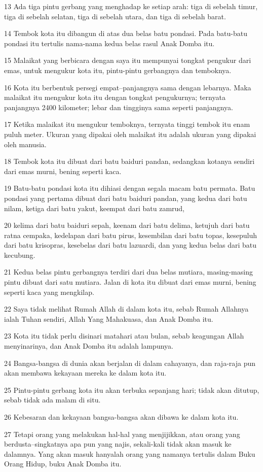 \par 13 Ada tiga pintu gerbang yang menghadap ke setiap arah: tiga di sebelah timur, tiga di sebelah selatan, tiga di sebelah utara, dan tiga di sebelah barat.
\par 14 Tembok kota itu dibangun di atas dua belas batu pondasi. Pada batu-batu pondasi itu tertulis nama-nama kedua belas rasul Anak Domba itu.
\par 15 Malaikat yang berbicara dengan saya itu mempunyai tongkat pengukur dari emas, untuk mengukur kota itu, pintu-pintu gerbangnya dan temboknya.
\par 16 Kota itu berbentuk persegi empat--panjangnya sama dengan lebarnya. Maka malaikat itu mengukur kota itu dengan tongkat pengukurnya; ternyata panjangnya 2400 kilometer; lebar dan tingginya sama seperti panjangnya.
\par 17 Ketika malaikat itu mengukur temboknya, ternyata tinggi tembok itu enam puluh meter. Ukuran yang dipakai oleh malaikat itu adalah ukuran yang dipakai oleh manusia.
\par 18 Tembok kota itu dibuat dari batu baiduri pandan, sedangkan kotanya sendiri dari emas murni, bening seperti kaca.
\par 19 Batu-batu pondasi kota itu dihiasi dengan segala macam batu permata. Batu pondasi yang pertama dibuat dari batu baiduri pandan, yang kedua dari batu nilam, ketiga dari batu yakut, keempat dari batu zamrud,
\par 20 kelima dari batu baiduri sepah, keenam dari batu delima, ketujuh dari batu ratna cempaka, kedelapan dari batu pirus, kesembilan dari batu topas, kesepuluh dari batu krisopras, kesebelas dari batu lazuardi, dan yang kedua belas dari batu kecubung.
\par 21 Kedua belas pintu gerbangnya terdiri dari dua belas mutiara, masing-masing pintu dibuat dari satu mutiara. Jalan di kota itu dibuat dari emas murni, bening seperti kaca yang mengkilap.
\par 22 Saya tidak melihat Rumah Allah di dalam kota itu, sebab Rumah Allahnya ialah Tuhan sendiri, Allah Yang Mahakuasa, dan Anak Domba itu.
\par 23 Kota itu tidak perlu disinari matahari atau bulan, sebab keagungan Allah menyinarinya, dan Anak Domba itu adalah lampunya.
\par 24 Bangsa-bangsa di dunia akan berjalan di dalam cahayanya, dan raja-raja pun akan membawa kekayaan mereka ke dalam kota itu.
\par 25 Pintu-pintu gerbang kota itu akan terbuka sepanjang hari; tidak akan ditutup, sebab tidak ada malam di situ.
\par 26 Kebesaran dan kekayaan bangsa-bangsa akan dibawa ke dalam kota itu.
\par 27 Tetapi orang yang melakukan hal-hal yang menjijikkan, atau orang yang berdusta--singkatnya apa pun yang najis, sekali-kali tidak akan masuk ke dalamnya. Yang akan masuk hanyalah orang yang namanya tertulis dalam Buku Orang Hidup, buku Anak Domba itu.

